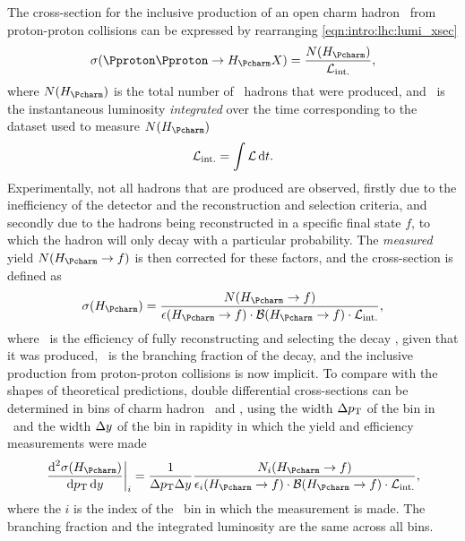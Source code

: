 The cross-section for the inclusive production of an open charm hadron \PHc\ 
from proton-proton collisions can be expressed by rearranging 
\cref{eqn:intro:lhc:lumi_xsec}
\begin{equation}
  \xsec(\ppToHc{}X) = \frac{N(\PHc)}{\intlumi},
  \label{eqn:prod:introduction:simple_cross_section}
\end{equation}
where $N(\PHc)$ is the total number of \PHc\ hadrons that were produced, and 
\intlumi\ is the instantaneous luminosity \emph{integrated} over the time 
corresponding to the dataset used to measure $N(\PHc)$
\begin{equation}
  \mathcal{L}_{\textnormal{int.}} = \int \mathcal{L} \mathop{}\!\textnormal{d}{t}.
  \label{eqn:prod:introduction:integrated_lumi}
\end{equation}
Experimentally, not all hadrons that are produced are observed, firstly due to 
the inefficiency of the detector and the reconstruction and selection criteria, 
and secondly due to the hadrons being reconstructed in a specific final state 
$f$, to which the hadron will only decay with a particular probability.
The \emph{measured} yield $N(\HcTof)$ is then corrected for these factors, and the 
cross-section is defined as
\begin{equation}
  \xsec(\PHc) = \frac{%
    N(\HcTof)
  }{%
    \eff(\HcTof)\cdot\bfrac(\HcTof)\cdot\intlumi
  },
  \label{eqn:prod:introduction:cross_section}
\end{equation}
where \eff\ is the efficiency of fully reconstructing and selecting the decay 
\HcTof, given that it was produced, \bfrac\ is the branching fraction of the 
decay, and the inclusive production from proton-proton collisions is now 
implicit.
To compare with the shapes of theoretical predictions, double differential 
cross-sections can be determined in bins of charm hadron \pT\ and \rapidity, 
using the width $\Delta p_{\textnormal{T}}$ of the bin in \pT\ and the width $\Delta y$ 
of the bin in rapidity in which the yield and efficiency measurements were made
\begin{equation}
  \left.\frac{\dif^{2}{\xsec(\PHc)}}{\dif{\pT}\dif{\rapidity}}\right\rvert_{i}
    = \frac{1}{\Delta\pT\Delta\rapidity}
      \frac{%
        N_{i}(\HcTof)
      }{%
        \eff_{i}(\HcTof)\cdot\bfrac(\HcTof)\cdot\intlumi
      },
  \label{eqn:prod:introduction:differential_cross_section}
\end{equation}
where the $i$ is the index of the \pTy\ bin in which the measurement is made.
The branching fraction and the integrated luminosity are the same across all bins.

